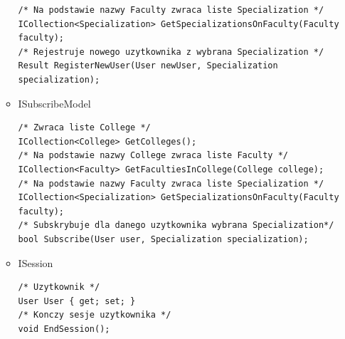 \documentclass[12pt,a4paper]{article}
\begin{document}
\begin{itemize}
\begin{itemize}
\begin{lstlisting}
/* Na podstawie nazwy Faculty zwraca liste Specialization */
ICollection<Specialization> GetSpecializationsOnFaculty(Faculty faculty);
/* Rejestruje nowego uzytkownika z wybrana Specialization */
Result RegisterNewUser(User newUser, Specialization specialization);
\end{lstlisting}					
					\item ISubscribeModel
\begin{lstlisting}
/* Zwraca liste College */
ICollection<College> GetColleges();
/* Na podstawie nazwy College zwraca liste Faculty */
ICollection<Faculty> GetFacultiesInCollege(College college);
/* Na podstawie nazwy Faculty zwraca liste Specialization */
ICollection<Specialization> GetSpecializationsOnFaculty(Faculty faculty);
/* Subskrybuje dla danego uzytkownika wybrana Specialization*/
bool Subscribe(User user, Specialization specialization);
\end{lstlisting}			
					\item ISession
\begin{lstlisting}
/* Uzytkownik */
User User { get; set; }
/* Konczy sesje uzytkownika */
void EndSession();


\end{lstlisting}
\end{itemize}
\end{itemize}
\end{document}
